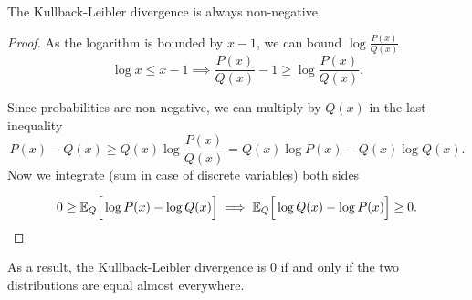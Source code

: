 \begin{proposition}
The Kullback-Leibler divergence is always non-negative.
\end{proposition}
\begin{proof}
  As the logarithm is bounded by \(x - 1\), we can bound \(\log{\frac{P(x)}{Q(x)}}\)
  \[
    \log{x} \leq x - 1 \implies \frac{P(x)}{Q(x)} - 1 \geq \log{\frac{P(x)}{Q(x)}}.
  \]

  Since probabilities are non-negative, we can multiply by \(Q(x)\) in the last inequality
  \[
    P(x) - Q(x) \geq Q(x) \log \frac{P(x)}{Q(x)} = Q(x) \log{P(x)} - Q(x) \log{Q(x)}.
  \]
  Now we integrate (sum in case of discrete variables) both sides

  \[
    0 \geq \mathbb{E}_{Q}\Big[\log{P(x)} - \log{Q(x)}\Big] \implies \mathbb{E}_{Q}\Big[\log{Q(x)}
    - \log{P(x)}\Big] \geq 0.
  \]
\end{proof}
As a result, the Kullback-Leibler divergence is \(0\) if and only if the two
distributions are equal almost everywhere.

